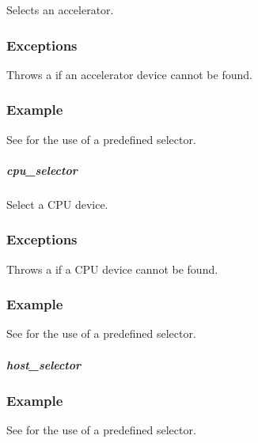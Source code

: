 \documentclass[letterpaper,10pt,english]{sphinxmanual}
\begin{document}
Selects an accelerator.
\subsubsection*{Exceptions}

Throws a  if an accelerator device cannot be found.
\subsubsection*{Example}

See {\hyperref[\detokenize{programming-interface/runtime/device-selector:gpu-selector-example}]{}} for the use of a pre\sphinxhyphen{}defined selector.


\subparagraph{cpu\_selector}
\label{\detokenize{programming-interface/runtime/device-selector:cpu-selector}}
\begin{sphinxVerbatim}[commandchars=\\\{\}]
 
\end{sphinxVerbatim}

Select a CPU device.
\subsubsection*{Exceptions}

Throws a  if a CPU device cannot be found.
\subsubsection*{Example}

See {\hyperref[\detokenize{programming-interface/runtime/device-selector:gpu-selector-example}]{}} for the use of a pre\sphinxhyphen{}defined selector.


\subparagraph{host\_selector}
\label{\detokenize{programming-interface/runtime/device-selector:host-selector}}
\begin{sphinxVerbatim}[commandchars=\\\{\}]
 
\end{sphinxVerbatim}
\subsubsection*{Example}

See {\hyperref[\detokenize{programming-interface/runtime/device-selector:gpu-selector-example}]{}} for the use of a pre\sphinxhyphen{}defined selector.
\end{document}
